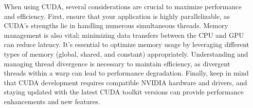 When using CUDA, several considerations are crucial to maximize performance and efficiency. First, ensure that your application is highly parallelizable, as CUDA's strengths lie in handling numerous simultaneous threads. Memory management is also vital; minimizing data transfers between the CPU and GPU can reduce latency. It's essential to optimize memory usage by leveraging different types of memory (global, shared, and constant) appropriately. Understanding and managing thread divergence is necessary to maintain efficiency, as divergent threads within a warp can lead to performance degradation. Finally, keep in mind that CUDA development requires compatible NVIDIA hardware and drivers, and staying updated with the latest CUDA toolkit versions can provide performance enhancements and new features.